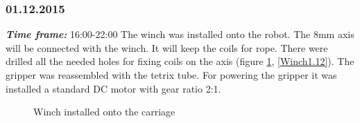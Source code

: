 \subsubsection{01.12.2015}
\textit{\textbf{Time frame:}} 16:00-22:00 \newline
The winch was installed onto the robot. The 8mm axis will be connected with the winch. It will keep the coils for rope. There were drilled all the needed holes for fixing coils on the axis (figure \ref{Winch1.11}, \ref{Winch1.12}). \newline
The gripper was reassembled with the tetrix tube. For powering the gripper it was installed a standard DC motor with gear ratio 2:1.

\begin{figure}[H]
	\begin{minipage}[h]{0.58\linewidth}
		\caption{Winch installed onto the carriage}
		\label{Winch1.11}
	\end{minipage}
	\hfill
	\begin{minipage}[h]{0.37\linewidth}

\end{minipage}
\end{figure}
